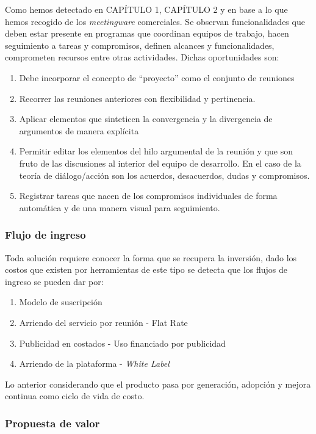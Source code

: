 Como hemos detectado en CAPÍTULO 1, CAPÍTULO 2 y en base a lo que hemos recogido de los \textit{meetingware} comerciales. Se observan funcionalidades que deben estar presente en programas que coordinan equipos de trabajo, hacen seguimiento a tareas y compromisos, definen alcances y funcionalidades, comprometen recursos entre otras actividades. Dichas oportunidades son:

\begin{enumerate}[1.]
	\item Debe incorporar el concepto de “proyecto” como el conjunto de reuniones
	\item Recorrer las reuniones anteriores con flexibilidad y pertinencia. 
	\item Aplicar elementos que sinteticen la convergencia y la divergencia de argumentos de manera explícita
	\item Permitir editar los elementos del hilo argumental de la reunión y que son fruto de las discusiones al interior del equipo de desarrollo. En el caso de la teoría de diálogo/acción son los acuerdos, desacuerdos, dudas y compromisos.
	\item Registrar tareas que nacen de los compromisos individuales de forma automática y de una manera visual para seguimiento.
\end{enumerate}

\subsubsection{Flujo de ingreso}

Toda solución requiere conocer la forma que se recupera la inversión, dado los costos que existen por herramientas de este tipo se detecta que los flujos de ingreso se pueden dar por: 

\begin{enumerate}[1.]
	\item Modelo de suscripción
	\item Arriendo del servicio por reunión - Flat Rate 
	\item Publicidad en costados - Uso financiado por publicidad
	\item Arriendo de la plataforma - \textit{White Label}
\end{enumerate}

Lo anterior considerando que el producto pasa por generación, adopción y mejora continua como ciclo de vida de costo.

\subsubsection{Propuesta de valor}

